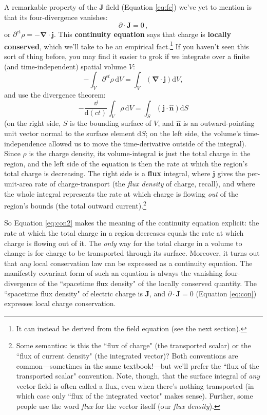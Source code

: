 \documentclass[12pt]{article}
\renewcommand{\vv}[1]{\mathbf{#1}}
\newcommand{\dd}[1]{\mathrm{d}#1}
\newcommand{\del}{\boldsymbol{\nabla}}
\begin{document}
A remarkable property of the $\vv J$ field (Equation \ref{eq:fc}) we've yet to mention is that its four-divergence vanishes:
\begin{equation}\label{eq:con}
\boxed{\partialup \cdot \vv J = 0} \, ,
\end{equation}
or $\partial^{ct} \rho = - \del \cdot \vv j$. This \textbf{continuity equation} says that charge is \textbf{locally conserved}, which we'll take to be an empirical fact.\footnote{\label{fn:chargeinv}It can instead be derived from the field equation (see the next section).} If you haven't seen this sort of thing before, you may find it easier to grok if we integrate over a finite (and time-independent) spatial volume $V$:
\begin{equation*}
- \int_V \partial^{ct} \rho \, \dd V = \int_V \left( \del \cdot \vv j \right) \dd V ,
\end{equation*}
and use the divergence theorem:
\begin{equation}\label{eq:con2}
- \dfrac{\dd}{\dd (ct)} \int_V \rho \, \dd V = \int_S \left( \vv j \cdot \vv{\hat{n}} \right) \dd S
\end{equation}
(on the right side, $S$ is the bounding surface of $V$, and $\vv{\hat{n}}$ is an outward-pointing unit vector normal to the surface element $\dd S$; on the left side, the volume's time-independence allowed us to move the time-derivative outside of the integral). Since $\rho$ is the charge density, its volume-integral is just the total charge in the region, and the left side of the equation is then the rate at which the region's total charge is decreasing. The right side is a \textbf{flux} integral, where $\vv j$ gives the per-unit-area rate of charge-transport (the \emph{flux density} of charge, recall), and where the whole integral represents the rate at which charge is flowing \emph{out} of the region's bounds (the total outward current).\footnote{\label{fn:flux}Some semantics: is this the ``flux of charge" (the transported scalar) or the ``flux of current density" (the integrated vector)? Both conventions are common---sometimes in the same textbook!---but we'll prefer the ``flux of the transported scalar" convention. Note, though, that the surface integral of \emph{any} vector field is often called a flux, even when there's nothing transported (in which case only ``flux of the integrated vector" makes sense). Further, some people use the word \emph{flux} for the vector itself (our \emph{flux density}).}

So Equation \ref{eq:con2} makes the meaning of the continuity equation explicit: the rate at which the total charge in a region decreases equals the rate at which charge is flowing out of it. The \emph{only} way for the total charge in a volume to change is for charge to be transported through its surface. Moreover, it turns out that \emph{any} local conservation law can be expressed as a continuity equation. The manifestly covariant form of such an equation is always the vanishing four-divergence of the ``spacetime flux density" of the locally conserved quantity. The ``spacetime flux density" of electric charge is $\vv J$, and $\partialup \cdot \vv J =  0$ (Equation \ref{eq:con}) expresses local charge conservation.
\end{document}
